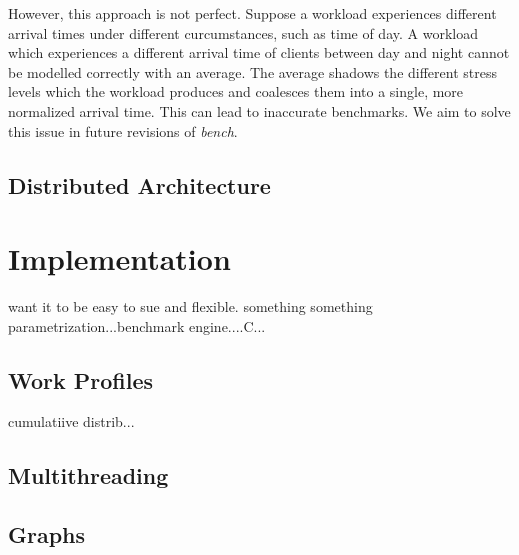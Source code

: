 \documentclass[10pt, author, twocolumn]{article}
\begin{document}
However, this approach is not perfect. Suppose a workload experiences different arrival times under different curcumstances, such as time of day. A workload which experiences a different arrival time of clients between day and night cannot be modelled correctly with an average. The average shadows the different stress levels which the workload produces and coalesces them into a single, more normalized arrival time. This can lead to inaccurate benchmarks. We aim to solve this issue in future revisions of \textit{bench}.

\subsection{Distributed Architecture}

\section{Implementation}
want it to be easy to sue and flexible. something something parametrization...benchmark engine....C...

\subsection{Work Profiles}
cumulatiive distrib...

\subsection{Multithreading}

\subsection{Graphs}
	 
\end{document}
